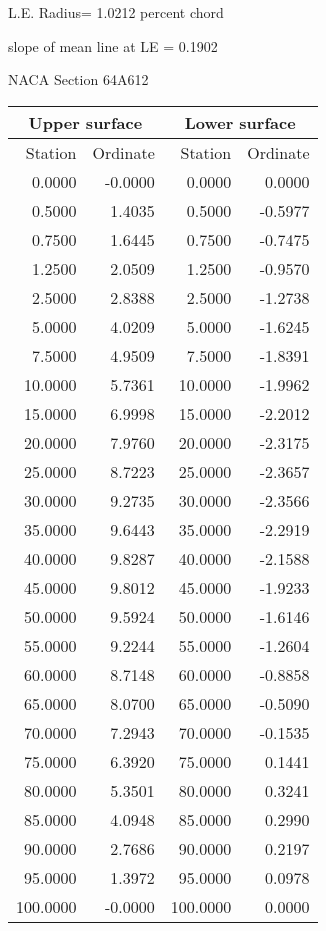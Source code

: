 \documentclass[11pt]{book}
\begin{document}
L.E. Radius=  1.0212 percent chord


 slope of mean line at LE =  0.1902
 \newpage
  \label{s64A612}
 \begin{Large}
 NACA Section 64A612
 \end{Large}
  
 \vspace{8mm}
 \begin{tabular}{|r|r|r|r|} \hline 
 \multicolumn{2}{|c|}{Upper surface} & \multicolumn{2}{|c|}{Lower surface} \\
 \hline
 Station & Ordinate & Station & Ordinate \\
 \hline
0.0000 & -0.0000 & 0.0000 & 0.0000 \\
0.5000 & 1.4035 & 0.5000 & -0.5977 \\
0.7500 & 1.6445 & 0.7500 & -0.7475 \\
1.2500 & 2.0509 & 1.2500 & -0.9570 \\
2.5000 & 2.8388 & 2.5000 & -1.2738 \\
5.0000 & 4.0209 & 5.0000 & -1.6245 \\
7.5000 & 4.9509 & 7.5000 & -1.8391 \\
10.0000 & 5.7361 & 10.0000 & -1.9962 \\
15.0000 & 6.9998 & 15.0000 & -2.2012 \\
20.0000 & 7.9760 & 20.0000 & -2.3175 \\
25.0000 & 8.7223 & 25.0000 & -2.3657 \\
30.0000 & 9.2735 & 30.0000 & -2.3566 \\
35.0000 & 9.6443 & 35.0000 & -2.2919 \\
40.0000 & 9.8287 & 40.0000 & -2.1588 \\
45.0000 & 9.8012 & 45.0000 & -1.9233 \\
50.0000 & 9.5924 & 50.0000 & -1.6146 \\
55.0000 & 9.2244 & 55.0000 & -1.2604 \\
60.0000 & 8.7148 & 60.0000 & -0.8858 \\
65.0000 & 8.0700 & 65.0000 & -0.5090 \\
70.0000 & 7.2943 & 70.0000 & -0.1535 \\
75.0000 & 6.3920 & 75.0000 & 0.1441 \\
80.0000 & 5.3501 & 80.0000 & 0.3241 \\
85.0000 & 4.0948 & 85.0000 & 0.2990 \\
90.0000 & 2.7686 & 90.0000 & 0.2197 \\
95.0000 & 1.3972 & 95.0000 & 0.0978 \\
100.0000 & -0.0000 & 100.0000 & 0.0000 \\
 \hline 
 \end{tabular}
\end{document}
